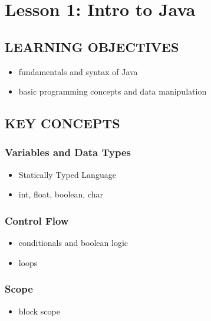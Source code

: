 \documentclass[14pt]{extreport}%
\begin{document}
\setcounter{chapter}{0}
\chapter{\Large{\textbf{Lesson 1}: Intro to Java}}

\vspace{-10pt}

\section*{LEARNING OBJECTIVES}
\begin{itemize}
    \item fundamentals and syntax of Java \item basic programming concepts and data manipulation
    
\end{itemize}

\section*{KEY CONCEPTS}
\subsection*{Variables and Data Types}
\begin{itemize}
    \item Statically Typed Language
    \item int, float, boolean, char 
\end{itemize}

\subsection*{Control Flow }
\begin{itemize}
    \item conditionals and boolean logic 
    \item loops
\end{itemize}

\subsection*{Scope}
\begin{itemize}
    \item block scope
    

    
\end{itemize}
\end{document}
